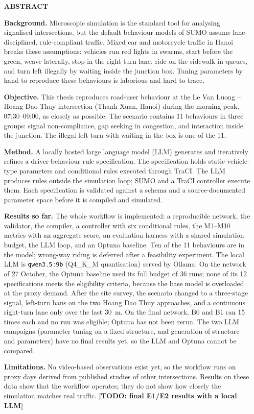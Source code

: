 \documentclass[../DoAn.tex]{subfiles}
\begin{document}
\begin{center}
    \Large{\textbf{ABSTRACT}}\\
\end{center}
\vspace{1cm}
\textbf{Background.} Microscopic simulation is the standard tool for analysing signalised intersections, but the default behaviour models of SUMO assume lane-disciplined, rule-compliant traffic. Mixed car and motorcycle traffic in Hanoi breaks these assumptions: vehicles run red lights in swarms, start before the green, weave laterally, stop in the right-turn lane, ride on the sidewalk in queues, and turn left illegally by waiting inside the junction box. Tuning parameters by hand to reproduce these behaviours is laborious and hard to trace.

\textbf{Objective.} This thesis reproduces road-user behaviour at the Le Van Luong -- Hoang Dao Thuy intersection (Thanh Xuan, Hanoi) during the morning peak, 07:30--09:00, as closely as possible. The scenario contains 11 behaviours in three groups: signal non-compliance, gap seeking in congestion, and interaction inside the junction. The illegal left turn with waiting in the box is one of the 11.

\textbf{Method.} A locally hosted large language model (LLM) generates and iteratively refines a driver-behaviour rule specification. The specification holds static vehicle-type parameters and conditional rules executed through TraCI. The LLM produces rules outside the simulation loop; SUMO and a TraCI controller execute them. Each specification is validated against a schema and a source-documented parameter space before it is compiled and simulated.

\textbf{Results so far.} The whole workflow is implemented: a reproducible network, the validator, the compiler, a controller with six conditional rules, the M1--M10 metrics with an aggregate score, an evaluation harness with a shared simulation budget, the LLM loop, and an Optuna baseline. Ten of the 11 behaviours are in the model; wrong-way riding is deferred after a feasibility experiment. The local LLM is \texttt{qwen3.5:9b} (Q4\_K\_M quantisation) served by Ollama. On the network of 27 October, the Optuna baseline used its full budget of 36 runs; none of its 12 specifications meets the eligibility criteria, because the base model is overloaded at the proxy demand. After the site survey, the scenario changed to a three-stage signal, left-turn bans on the two Hoang Dao Thuy approaches, and a continuous right-turn lane only over the last 30~m. On the final network, B0 and B1 ran 15 times each and no run was eligible; Optuna has not been rerun. The two LLM campaigns (parameter tuning on a fixed structure, and generation of structure and parameters) have no final results yet, so the LLM and Optuna cannot be compared.

\textbf{Limitations.} No video-based observations exist yet, so the workflow runs on proxy days derived from published studies of other intersections. Results on these data show that the workflow operates; they do not show how closely the simulation matches real traffic. \textbf{[TODO: final E1/E2 results with a local LLM]}
\end{document}
